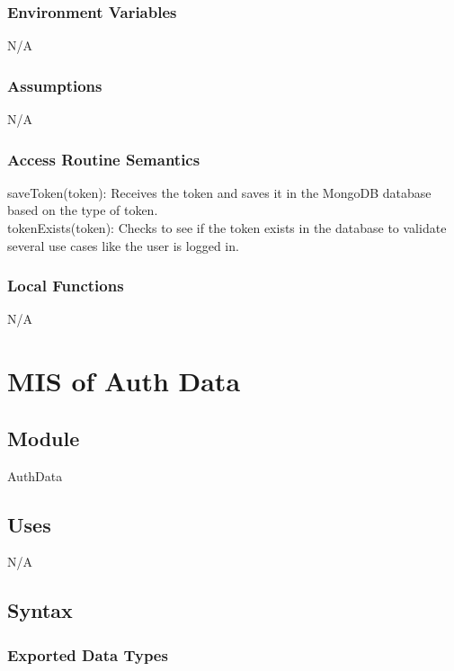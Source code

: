 \documentclass[12pt, titlepage]{article}
\begin{document}
	\subsubsection{Environment Variables}
	
	N/A
	
	\subsubsection{Assumptions}
	N/A
	
	\subsubsection{Access Routine Semantics}
	
	\noindent saveToken(token): Receives the token and saves it in the MongoDB database based on the type of token. \\
	
	\noindent tokenExists(token): Checks to see if the token exists in the database to validate several use cases like the user is logged in. \\
	
	\subsubsection{Local Functions}
	
	N/A
	
	\newpage
	
	
	\section{MIS of Auth Data} \label{Module} 
	
	\subsection{Module}
	AuthData
	
	\subsection{Uses}
	N/A
	
	\subsection{Syntax}
	\subsubsection{Exported Data Types}
	
\end{document}
